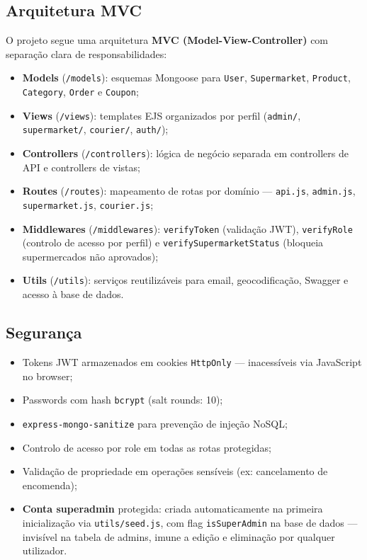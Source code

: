 \documentclass[12pt,a4paper]{article}
\begin{document}
\subsection{Arquitetura MVC}

O projeto segue uma arquitetura \textbf{MVC (Model-View-Controller)} com separação clara de responsabilidades:

\begin{itemize}[leftmargin=*, label=\textcolor{primaryblue}{\textbullet}]
  \item \textbf{Models} (\texttt{/models}): esquemas Mongoose para \texttt{User}, \texttt{Supermarket}, \texttt{Product}, \texttt{Category}, \texttt{Order} e \texttt{Coupon};
  \item \textbf{Views} (\texttt{/views}): templates EJS organizados por perfil (\texttt{admin/}, \texttt{supermarket/}, \texttt{courier/}, \texttt{auth/});
  \item \textbf{Controllers} (\texttt{/controllers}): lógica de negócio separada em controllers de API e controllers de vistas;
  \item \textbf{Routes} (\texttt{/routes}): mapeamento de rotas por domínio --- \texttt{api.js}, \texttt{admin.js}, \texttt{supermarket.js}, \texttt{courier.js};
  \item \textbf{Middlewares} (\texttt{/middlewares}): \texttt{verifyToken} (validação JWT), \texttt{verifyRole} (controlo de acesso por perfil) e \texttt{verifySupermarketStatus} (bloqueia supermercados não aprovados);
  \item \textbf{Utils} (\texttt{/utils}): serviços reutilizáveis para email, geocodificação, Swagger e acesso à base de dados.
\end{itemize}

\subsection{Segurança}

\begin{itemize}[leftmargin=*, label=\textcolor{primaryblue}{\textbullet}]
  \item Tokens JWT armazenados em cookies \texttt{HttpOnly} — inacessíveis via JavaScript no browser;
  \item Passwords com hash \texttt{bcrypt} (salt rounds: 10);
  \item \texttt{express-mongo-sanitize} para prevenção de injeção NoSQL;
  \item Controlo de acesso por role em todas as rotas protegidas;
  \item Validação de propriedade em operações sensíveis (ex: cancelamento de encomenda);
  \item \textbf{Conta superadmin} protegida: criada automaticamente na primeira inicialização via \texttt{utils/seed.js}, com flag \texttt{isSuperAdmin} na base de dados — invisível na tabela de admins, imune a edição e eliminação por qualquer utilizador.
\end{itemize}
\end{document}
